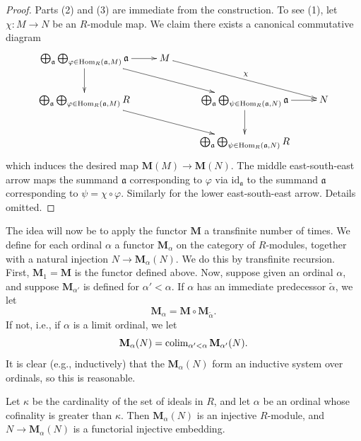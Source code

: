 \begin{proof}
Parts (2) and (3) are immediate from the construction.
To see (1), let $\chi : M \to N$ be an $R$-module map. We claim there exists
a canonical commutative diagram
$$
\xymatrix{
\bigoplus_{\mathfrak a}
\bigoplus_{\varphi \in \Hom_R(\mathfrak a, M)}
\mathfrak{a} \ar[r] \ar[d] \ar[rrd] & M \ar[rrd]^\chi \\
\bigoplus_{\mathfrak a}
\bigoplus_{\varphi \in \Hom_R(\mathfrak a, M)}
R \ar[rrd] & &
\bigoplus_{\mathfrak a}
\bigoplus_{\psi \in \Hom_R(\mathfrak a, N)}
\mathfrak{a} \ar[r] \ar[d] & N \\
& & \bigoplus_{\mathfrak a}
\bigoplus_{\psi \in \Hom_R(\mathfrak a, N)}
R
}
$$
which induces the desired map $\mathbf{M}(M) \to \mathbf{M}(N)$.
The middle east-south-east arrow maps the summand $\mathfrak a$
corresponding to $\varphi$ via $\text{id}_{\mathfrak a}$ to the
summand $\mathfrak a$ corresponding to $\psi = \chi \circ \varphi$.
Similarly for the lower east-south-east arrow. Details omitted.
\end{proof}

\noindent
The idea will now be to apply the functor $\mathbf{M}$ a transfinite number
of times. We define for each ordinal $\alpha$ a functor $\mathbf{M}_\alpha$
on the category of $R$-modules, together with a natural injection $N \to
\mathbf{M}_\alpha(N)$. We do this by transfinite recursion.
First, $\mathbf{M}_1 = \mathbf{M}$ is the functor defined above.
Now, suppose given an ordinal $\alpha$, and suppose $\mathbf{M}_{\alpha'}$
is defined for $\alpha' < \alpha$. If $\alpha$ has an immediate predecessor
$\widetilde{\alpha}$, we let
$$
\mathbf{M}_\alpha = \mathbf{M} \circ \mathbf{M}_{\widetilde{\alpha}}.
$$
If not, i.e., if $\alpha$ is a limit ordinal, we let
$$
\mathbf{M}_{\alpha}(N) =
\mathop{\mathrm{colim}}\nolimits_{\alpha' < \alpha} \mathbf{M}_{\alpha'}(N).
$$
It is clear (e.g., inductively) that the $\mathbf{M}_{\alpha}(N)$
form an inductive system over ordinals, so this is reasonable.

\begin{theorem}
\label{theorem-baer-grothendieck}
Let $\kappa$ be the cardinality of the set of ideals in $R$, and
let $\alpha$ be an ordinal whose cofinality is greater than
$\kappa$. Then $\mathbf{M}_\alpha(N)$ is an injective $R$-module,
and $N \to \mathbf{M}_\alpha(N)$ is a functorial injective embedding.
\end{theorem}

